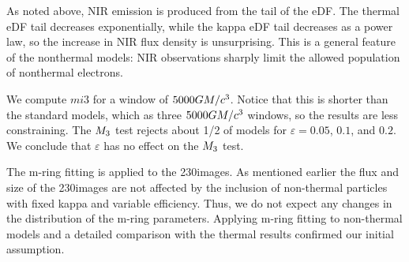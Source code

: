 As noted above, NIR emission is produced from the tail of the eDF.  The thermal eDF tail decreases exponentially, while the kappa eDF tail decreases as a power law, so the increase in NIR flux density is unsurprising.  This is a general feature of the nonthermal models: NIR observations sharply limit the allowed population of nonthermal electrons.


We compute $mi{3}$ for a window of $\num{5000}GM/c^3$.  Notice that this is shorter than the standard models, which as three $\num{5000}GM/c^3$ windows, so the results are less constraining.  The $M_{3}$ test rejects about 1/2 of models for $\varepsilon = 0.05$, $0.1$, and $0.2$.  We conclude that $\varepsilon$ has no effect on the $M_{3}$ test.



The m-ring fitting is applied to the 230\GHz images. As mentioned earlier the flux and size of the 230\GHz images are not affected by the inclusion of non-thermal particles with fixed kappa and variable efficiency. Thus, we do not expect any changes in the distribution of the m-ring parameters.  Applying m-ring fitting to non-thermal models and a detailed comparison with the thermal results confirmed our initial assumption.


